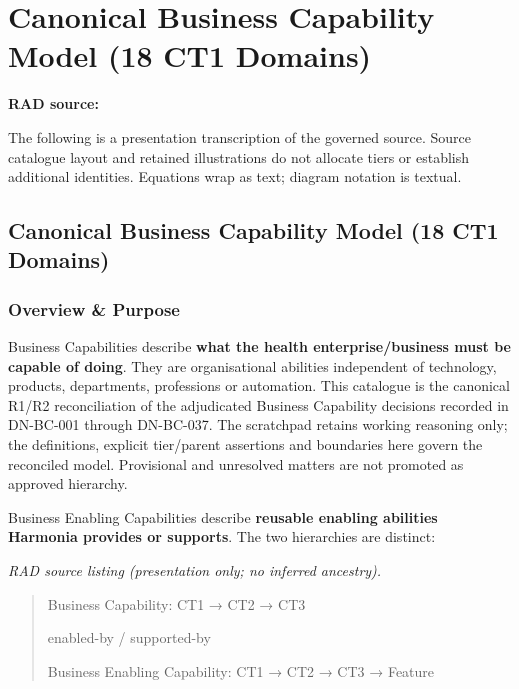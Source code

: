 \chapter{Canonical Business Capability Model (18 CT1 Domains)}\label{rad:business}
\noindent\textbf{RAD source:} \texttt{}

The following is a presentation transcription of the governed source. Source catalogue layout and retained illustrations do not allocate tiers or establish additional identities. Equations wrap as text; diagram notation is textual.

\label{rad:business:1}
\section*{Canonical Business Capability Model (18 CT1 Domains)}
\label{rad:business:3}
\subsection*{Overview \& Purpose}
\label{rad:business:5}

Business Capabilities describe \textbf{what the health enterprise/\allowbreak{}business must be capable of doing}. They are organisational abilities independent of technology, products, departments, professions or automation. This catalogue is the canonical R1/\allowbreak{}R2 reconciliation of the adjudicated Business Capability decisions recorded in DN-BC-001 through DN-BC-037. The scratchpad retains working reasoning only; the definitions, explicit tier/\allowbreak{}parent assertions and boundaries here govern the reconciled model. Provisional and unresolved matters are not promoted as approved hierarchy.

\label{rad:business:14}

Business Enabling Capabilities describe \textbf{reusable enabling abilities Harmonia provides or supports}. The two hierarchies are distinct:

\label{rad:business:17}

\textit{RAD source listing (presentation only; no inferred ancestry).}
\begin{quote}
Business Capability:          CT1 → CT2 → CT3

enabled-by / supported-by

Business Enabling Capability: CT1 → CT2 → CT3 → Feature
\end{quote}
\label{rad:business:23}

